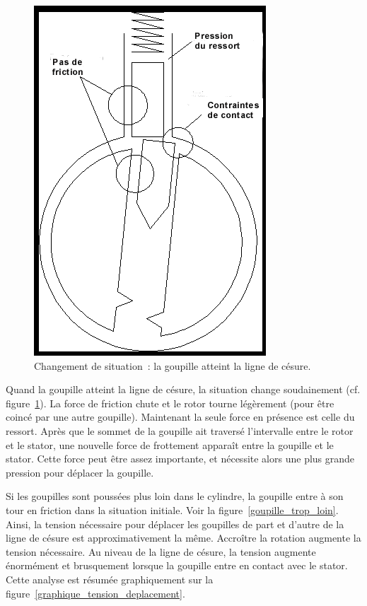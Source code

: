 \documentclass[a4paper,french,11pt,twoside]{report}
\begin{document}
\begin{figure}[h]
  \begin{center}
    \includegraphics[scale=0.7]{images/Image11}
    \caption{Changement de situation~: la goupille atteint la ligne de césure.\label{goupille_ligne_cesure}}
  \end{center}
\end{figure}

Quand la goupille atteint la ligne de césure, la situation change soudainement (cf. figure~\ref{goupille_ligne_cesure}). La force de friction chute et le rotor tourne légèrement (pour être coincé par une autre goupille). Maintenant la seule force en présence est celle du ressort. Après que le sommet de la goupille ait traversé l'intervalle entre le rotor et le stator, une nouvelle force de frottement apparaît entre la goupille et le stator. Cette force peut être assez importante, et nécessite alors une plus grande pression pour déplacer la goupille.

Si les goupilles sont poussées plus loin dans le cylindre, la goupille entre à son tour en friction dans la situation initiale. Voir la figure~\ref{goupille_trop_loin}. Ainsi, la tension nécessaire pour déplacer les goupilles de part et d'autre de la ligne de césure est approximativement la même. Accroître la rotation augmente la tension nécessaire. Au niveau de la ligne de césure, la tension augmente énormément et brusquement lorsque la goupille entre en contact avec le stator. Cette analyse est résumée graphiquement sur la figure~\ref{graphique_tension_deplacement}.
\end{document}
